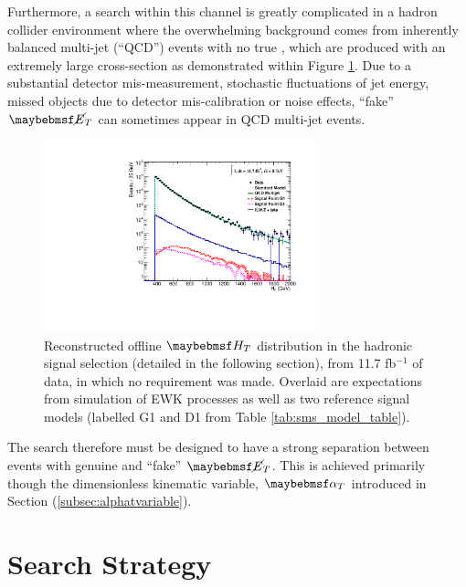 Furthermore, a search within this channel is greatly complicated in a hadron collider environment where the overwhelming background comes from inherently balanced multi-jet (``QCD'') events with no true \met, which are produced with an extremely large cross-section as demonstrated within Figure \ref{fig:htqcdbackground}. Due to a substantial detector mis-measurement, stochastic fluctuations of jet energy, missed objects due to detector mis-calibration or noise effects, ``fake'' $\met$ can sometimes appear in QCD multi-jet events. 

\begin{figure}[!h]

\centering
\includegraphics[width=0.70\textwidth]{plots/ra1_htdistribution.pdf}
\caption[Reconstructed offline $\theht$ distribution in the hadronic signal selection (detailed in the following section), from 11.7 fb$^{-1}$ of data, in which no \alphat requirement was made.]{Reconstructed offline $\theht$ distribution in the hadronic signal selection (detailed in the following section), from 11.7 fb$^{-1}$ of data, in which no \alphat requirement was made. Overlaid are expectations from simulation of \ac{EWK} processes as well as two reference signal models (labelled G1 and D1 from Table \ref{tab:sms_model_table}).}  
\label{fig:htqcdbackground}
\end{figure}

The search therefore must be designed to have a strong separation between events with genuine and ``fake'' $\met$. This is achieved primarily though the dimensionless kinematic variable, $\alphat$ \cite{alphat7tev}\cite{CMS:2008vya} introduced in Section (\ref{subsec:alphatvariable}).

\section{Search Strategy}
\label{subsec:searchstrategy}

